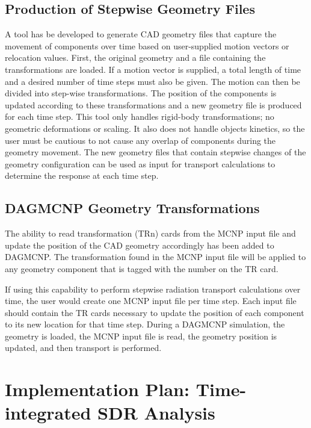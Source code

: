 \subsection{Production of Stepwise Geometry Files}\label{sec:timestep_geoms}
A tool has be developed to generate CAD geometry files that capture the 
movement of components over time based on user-supplied motion vectors or relocation values.  
First, the original geometry and a file containing the transformations are
loaded.
If a motion vector is supplied, a total length of time and a desired number of 
time steps must also be given. The motion can then be divided into step-wise 
transformations. The position of the components 
is updated according to these transformations and a new geometry file is 
produced for each time step.  This tool only handles rigid-body
transformations; no geometric deformations or scaling.  It also does not handle
objects kinetics, 
so the user must be cautious to not cause any overlap of components during the
geometry movement.
The new geometry files that contain stepwise changes of the geometry 
configuration can be used as input for
transport calculations to determine the response at each time step.


\subsection{DAGMCNP Geometry Transformations}\label{sec:mcnp_tr}
The ability to read transformation (TRn) cards from the MCNP input file and 
update the position of the CAD geometry accordingly has been added to DAGMCNP.  
The transformation found in the MCNP 
input file will be applied to any geometry component that is tagged with the 
number on the TR card. 

If using this capability to perform stepwise radiation transport calculations
over time, the user would create one MCNP input file per time step.  Each input file 
should contain the TR cards necessary to update the position of each component 
to its new location for that time step.  During a DAGMCNP simulation, the 
geometry is loaded, the MCNP input file is read, the geometry position is 
updated, and then transport is performed.

\section{Implementation Plan: Time-integrated SDR Analysis}\label{sec:implementation}

